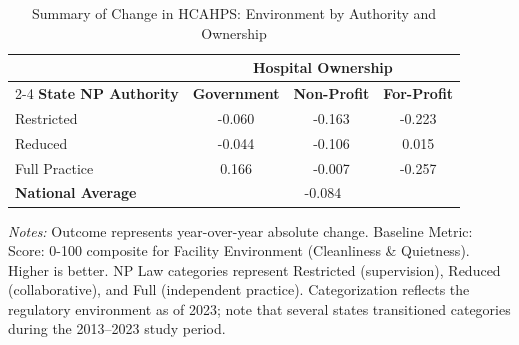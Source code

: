 \begin{table}[htbp]
    \centering
    \caption{Summary of Change in HCAHPS: Environment by Authority and Ownership}
    \label{tab:d_hcahps_grp3}
    \vspace{0.2cm}
    \begin{tabular}{lccc}
        \toprule
        & \multicolumn{3}{c}{\textbf{Hospital Ownership}} \\
        \cmidrule(lr){2-4}
        \textbf{State NP Authority} & \textbf{Government} & \textbf{Non-Profit} & \textbf{For-Profit} \\
        \midrule
        Restricted & -0.060 & -0.163 & -0.223 \\
        Reduced & -0.044 & -0.106 & 0.015 \\
        Full Practice & 0.166 & -0.007 & -0.257 \\
        \midrule
        \textbf{National Average} & \multicolumn{3}{c}{-0.084} \\
        \bottomrule
    \end{tabular}
    \vspace{0.1cm}
    \begin{minipage}{0.85\textwidth}
        \footnotesize \textit{Notes:} Outcome represents year-over-year absolute change. Baseline Metric: Score: 0-100 composite for Facility Environment (Cleanliness \& Quietness). Higher is better. NP Law categories represent Restricted (supervision), Reduced (collaborative), and Full (independent practice). Categorization reflects the regulatory environment as of 2023; note that several states transitioned categories during the 2013--2023 study period.
    \end{minipage}
\end{table}